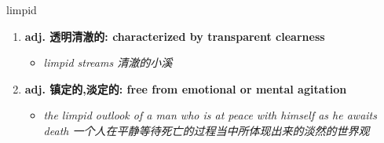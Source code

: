 
\begin{frame}
{\huge limpid}
\begin{center}
\begin{enumerate}\Large
  \item \textbf{adj. 透明清澈的: characterized by transparent clearness}
  \begin{itemize}
    \item \em{\Large{limpid streams 清澈的小溪}}
  \end{itemize}
  \item \textbf{adj. 镇定的,淡定的: free from emotional or mental agitation}
  \begin{itemize}
    \item \em{\Large{the limpid outlook of a man who is at peace with himself as he awaits death 一个人在平静等待死亡的过程当中所体现出来的淡然的世界观}}
  \end{itemize}
\end{enumerate}
\end{center}
\end{frame}
